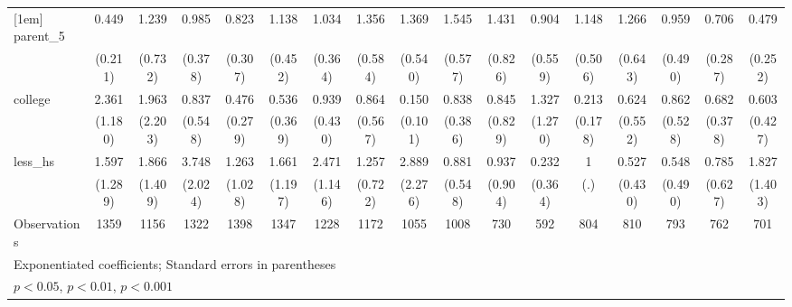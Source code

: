 {\begin{tabular}{l*{16}{c}}
[1em]
parent\_5            &       0.449         &       1.239         &       0.985         &       0.823         &       1.138         &       1.034         &       1.356         &       1.369         &       1.545         &       1.431         &       0.904         &       1.148         &       1.266         &       0.959         &       0.706         &       0.479         \\
                    &     (0.211)         &     (0.732)         &     (0.378)         &     (0.307)         &     (0.452)         &     (0.364)         &     (0.584)         &     (0.540)         &     (0.577)         &     (0.826)         &     (0.559)         &     (0.506)         &     (0.643)         &     (0.490)         &     (0.287)         &     (0.252)         \\
[1em]
college             &       2.361         &       1.963         &       0.837         &       0.476         &       0.536         &       0.939         &       0.864         &       0.150\sym{**} &       0.838         &       0.845         &       1.327         &       0.213         &       0.624         &       0.862         &       0.682         &       0.603         \\
                    &     (1.180)         &     (2.203)         &     (0.548)         &     (0.279)         &     (0.369)         &     (0.430)         &     (0.567)         &     (0.101)         &     (0.386)         &     (0.829)         &     (1.270)         &     (0.178)         &     (0.552)         &     (0.528)         &     (0.378)         &     (0.427)         \\
[1em]
less\_hs             &       1.597         &       1.866         &       3.748\sym{*}  &       1.263         &       1.661         &       2.471         &       1.257         &       2.889         &       0.881         &       0.937         &       0.232         &           1         &       0.527         &       0.548         &       0.785         &       1.827         \\
                    &     (1.289)         &     (1.409)         &     (2.024)         &     (1.028)         &     (1.197)         &     (1.146)         &     (0.722)         &     (2.276)         &     (0.548)         &     (0.904)         &     (0.364)         &         (.)         &     (0.430)         &     (0.490)         &     (0.627)         &     (1.403)         \\
\hline
Observations        &        1359         &        1156         &        1322         &        1398         &        1347         &        1228         &        1172         &        1055         &        1008         &         730         &         592         &         804         &         810         &         793         &         762         &         701         \\
\hline\hline
\multicolumn{17}{l}{\footnotesize Exponentiated coefficients; Standard errors in parentheses}\\
\multicolumn{17}{l}{\footnotesize \sym{*} \(p<0.05\), \sym{**} \(p<0.01\), \sym{***} \(p<0.001\)}\\
\end{tabular}
}

